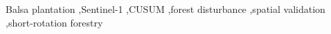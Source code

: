 \documentclass[a4paper,fleqn]{cas-sc}
\begin{document}
\begin{keywords}
Balsa plantation \sep Sentinel-1 \sep CUSUM \sep forest disturbance \sep spatial validation \sep short-rotation forestry
\end{keywords}

\maketitle
\doublespacing









\printcredits


\end{document}
